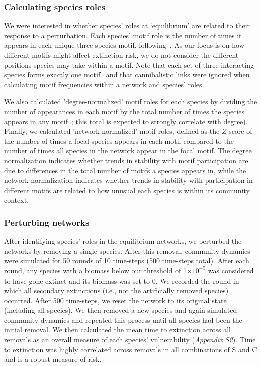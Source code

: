 \documentclass[12pt]{article}
\begin{document}
\begin{spacing}{2.0}
    
    	\subsubsection*{Calculating species roles}
    
    
    		We were interested in whether species' roles at `equilibrium' are related to their response to a perturbation. 
            Each species' motif role is the number of times it appears in each unique three-species motif, following~\citet{Stouffer2012,Cirtwill2015}. 
            As our focus is on how different motifs might affect extinction risk, we do not consider the different positions species may take within a motif.   
            Note that each set of three interacting species forms exactly one motif~\citep{Cirtwill2018FoodWebs} and that cannibalistic links were ignored when calculating motif frequencies within a network and species' roles. 


            We also calculated 'degree-normalized' motif roles for each species by dividing the number of appearances in each motif by the total number of times the species appears in any motif~\citep{Cirtwill2015}; this total is expected to strongly correlate with degree). 
            Finally, we calculated 'network-normalized' motif roles, defined as the $Z$-score of the number of times a focal species appears in each motif compared to the number of times all species in the network appear in the focal motif.
    		The degree normalization indicates whether trends in stability with motif participation are due to differences in the total number of motifs a species appears in, while the network normalization indicates whether trends in stability with participation in different motifs are related to how unusual each species is within its community context.
    
    
    	\subsubsection*{Perturbing networks}
    
    		After identifying species' roles in the equilibrium networks, we perturbed the networks by removing a single species. 
            After this removal, community dynamics were simulated for 50 rounds of 10 time-steps (500 time-steps total). 
            After each round, any species with a biomass below our threshold of 1$\times10^{-5}$ was considered to have gone extinct and its biomass was set to 0. 
            We recorded the round in which all secondary extinctions (i.e., not the artificially removed species) occurred. 
            After 500 time-steps, we reset the network to its original state (including all species). 
            We then removed a new species and again simulated community dynamics and repeated this process until all species had been the initial removal.
    		We then calculated the mean time to extinction across all removals as an overall measure of each species' vulnerability (\emph{Appendix S2}). 
    		Time to extinction was highly correlated across removals in all combinations of S and C and is a robust measure of risk.



\end{spacing}
\end{document}
